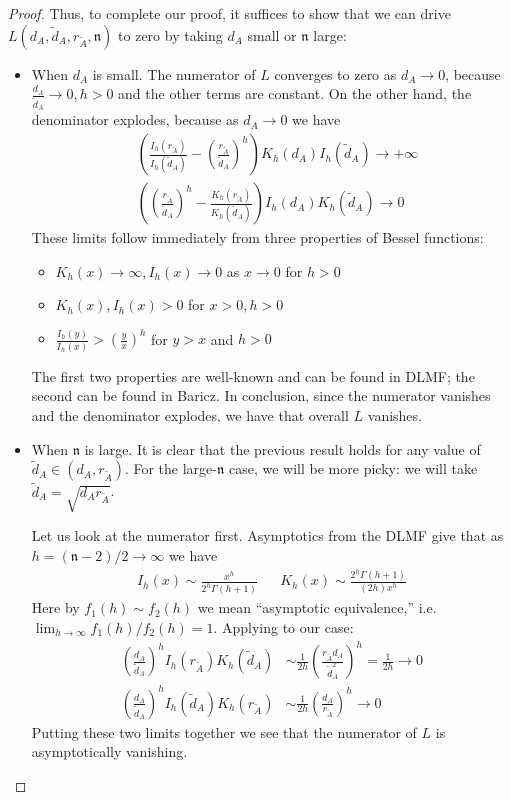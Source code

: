 \documentclass[english, aip, jcp, priprint, graphicx,floatfix]{revtex4-1}
\theoremstyle{plain}
\theoremstyle{definition}
\theoremstyle{plain}
\newcommand{\dimension}{{\mathfrak{n}}}
\begin{document}
\begin{proof}
Thus, to complete our proof, it suffices to show that we can drive $L(d_A, \tilde d_A, r_{\tilde A},\dimension)$ to zero by taking $d_A$ small or $\dimension$ large:
\begin{itemize}
    \item When $d_A$ is small.  The numerator of $L$ converges to zero as $d_A\rightarrow 0$, because $\frac{d_A}{\tilde{d}_A}\rightarrow 0,h>0$ and the other terms are constant.  On the other hand, the denominator explodes, because as $d_A\rightarrow0$ we have
    \begin{align*}
    & \left( \frac{I_h ( r_{\tilde{A}})}{I_h ( \tilde{d}_A)} - \left(\frac{r_{\tilde{A}}}{\tilde{d}_A} \right)^h  \right)
                K_h ( d_A) I_h ( \tilde{d}_A) \rightarrow +\infty \\
    & \left( \left( \frac{r_{\tilde{A}}}{\tilde{d}_A}\right)^h  - \frac{K_h ( r_{\tilde{A}})}{K_h ( \tilde{d}_A)} \right) 
                I_h (d_A)K_h ( \tilde{d}_A)\rightarrow 0
    \end{align*}
    These limits follow immediately from three properties of Bessel functions:
    \begin{itemize}
        \item $K_h(x)\rightarrow \infty,I_h(x)\rightarrow 0$ as $x\rightarrow 0$ for $h>0$
        \item $K_h(x),I_h(x)>0$ for $x>0,h>0$
        \item $\frac{I_{h}(y)}{I_{h}(x)} > \left(\frac{y}{x}\right)^{h}$ for $y>x$ and $h>0$
    \end{itemize} 
    The first two properties are well-known and can be found in DLMF\cite{noauthor_undated-ti}; the second can be found in Baricz.\cite{noauthor_undated-ti,baricz2010bounds}  In conclusion, since the numerator vanishes and the denominator explodes, we have that overall $L$ vanishes.  
    \item When $\dimension$ is large.  It is clear that the previous result holds for any value of $\tilde d_A\in (d_A, r_{\tilde A})$.  For the large-$\dimension$ case, we will be more picky: we will take $\tilde d_A=\sqrt{d_A r_{\tilde A}}$.  

    Let us look at the numerator first.  Asymptotics from the DLMF give that as $h=(\dimension-2)/2 \rightarrow \infty$ we have
    \begin{align*}
    I_h(x) \sim \frac{x^h}{2^h\Gamma(h+1)} & & K_h(x) \sim \frac{2^h\Gamma(h+1)}{(2h)x^h}  
    \end{align*}
    Here by $f_1(h)\sim f_2(h)$ we mean ``asymptotic equivalence,'' i.e.\ $\lim_{h\rightarrow\infty}f_1(h)/f_2(h)=1$. Applying to our case:
    \begin{align*}
        \left(\frac{d_A}{\tilde{d}_A}\right)^h I_h (r_{\tilde{A}}) K_h ( \tilde{d}_A) &
	\sim \frac{1}{2h}\left(\frac{r_{\tilde{A}} d_A}{\tilde{d}_A^2}\right)^h = \frac{1}{2h} \rightarrow 0 \\
        \left(\frac{d_A}{\tilde{d}_A}\right)^h I_h ( \tilde{d}_A) K_h (r_{\tilde{A}}) &
	\sim \frac{1}{2h}\left(\frac{ d_A}{r_{\tilde A}}\right)^h \rightarrow 0
    \end{align*}
    Putting these two limits together we see that the numerator of $L$ is asymptotically vanishing.


\end{itemize}
\end{proof}
\end{document}
